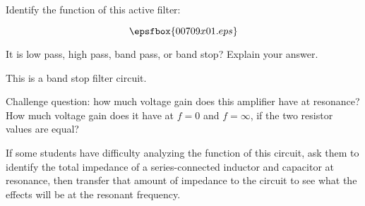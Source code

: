 

Identify the function of this active filter:

$$\epsfbox{00709x01.eps}$$

It is low pass, high pass, band pass, or band stop?  Explain your answer.







This is a band stop filter circuit.

\vskip 10pt

Challenge question: how much voltage gain does this amplifier have at resonance?  How much voltage gain does it have at $f = 0$ and $f = \infty$, if the two resistor values are equal?







If some students have difficulty analyzing the function of this circuit, ask them to identify the total impedance of a series-connected inductor and capacitor at resonance, then transfer that amount of impedance to the circuit to see what the effects will be at the resonant frequency.




